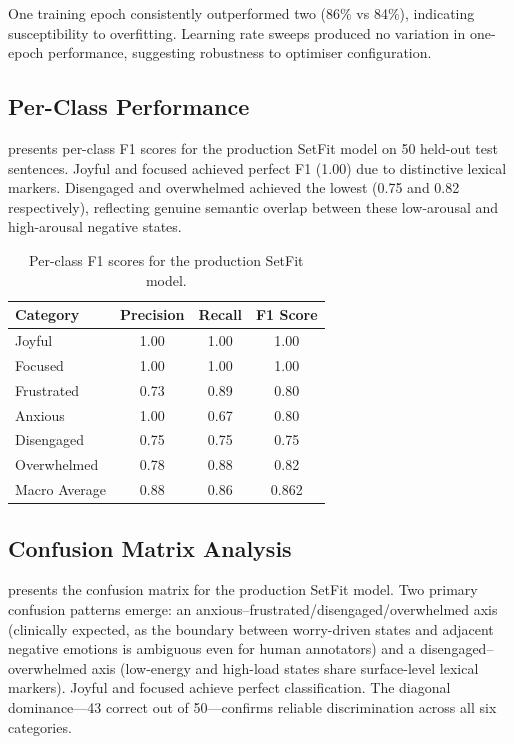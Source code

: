 One training epoch consistently outperformed two (86\% vs 84\%), indicating susceptibility to overfitting. Learning rate sweeps produced no variation in one-epoch performance, suggesting robustness to optimiser configuration.

\subsection{Per-Class Performance}
\label{subsec:per-class-performance}

 presents per-class F1 scores for the production SetFit model on 50 held-out test sentences. Joyful and focused achieved perfect F1 (1.00) due to distinctive lexical markers. Disengaged and overwhelmed achieved the lowest (0.75 and 0.82 respectively), reflecting genuine semantic overlap between these low-arousal and high-arousal negative states.

\begin{table}[htbp]
  \centering
  \caption{Per-class F1 scores for the production SetFit model.}
  \label{tab:per-class-f1}
  \begin{tabular}{@{}lccc@{}}
    \toprule
    \textbf{Category} & \textbf{Precision} & \textbf{Recall} & \textbf{F1 Score} \\
    \midrule
    Joyful      & 1.00 & 1.00 & 1.00 \\
    Focused     & 1.00 & 1.00 & 1.00 \\
    Frustrated  & 0.73 & 0.89 & 0.80 \\
    Anxious     & 1.00 & 0.67 & 0.80 \\
    Disengaged  & 0.75 & 0.75 & 0.75 \\
    Overwhelmed & 0.78 & 0.88 & 0.82 \\
    \midrule
    Macro Average & 0.88 & 0.86 & 0.862 \\
    \bottomrule
  \end{tabular}
\end{table}

\subsection{Confusion Matrix Analysis}
\label{subsec:confusion-matrix}

 presents the confusion matrix for the production SetFit model. Two primary confusion patterns emerge: an anxious--frustrated/disengaged/overwhelmed axis (clinically expected, as the boundary between worry-driven states and adjacent negative emotions is ambiguous even for human annotators) and a disengaged--overwhelmed axis (low-energy and high-load states share surface-level lexical markers). Joyful and focused achieve perfect classification. The diagonal dominance---43 correct out of 50---confirms reliable discrimination across all six categories.

